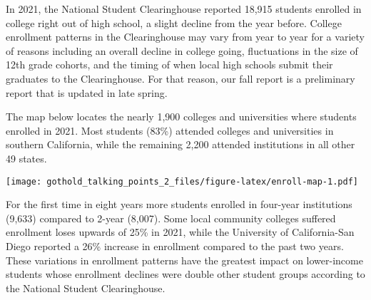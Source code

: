 \documentclass[
  11pt,
]{article}
\begin{document}
\contactinfo{}

\newpage{}


In 2021, the National Student Clearinghouse reported 18,915 students
enrolled in college right out of high school, a slight decline from the
year before. College enrollment patterns in the Clearinghouse may vary
from year to year for a variety of reasons including an overall decline
in college going, fluctuations in the size of 12th grade cohorts, and
the timing of when local high schools submit their graduates to the
Clearinghouse. For that reason, our fall report is a preliminary report
that is updated in late spring.

The map below locates the nearly 1,900 colleges and universities where
students enrolled in 2021. Most students (83\%) attended colleges and
universities in southern California, while the remaining 2,200 attended
institutions in all other 49 states.


\texttt{[image: gothold\_talking\_points\_2\_files/figure-latex/enroll-map-1.pdf]}

\newpage{}


For the first time in eight years more students enrolled in four-year
institutions (9,633) compared to 2-year (8,007). Some local community
colleges suffered enrollment loses upwards of 25\% in 2021, while the
University of California-San Diego reported a 26\% increase in
enrollment compared to the past two years. These variations in
enrollment patterns have the greatest impact on lower-income students
whose enrollment declines were double other student groups according to
the National Student Clearinghouse.

\vspace{3mm}
\end{document}
